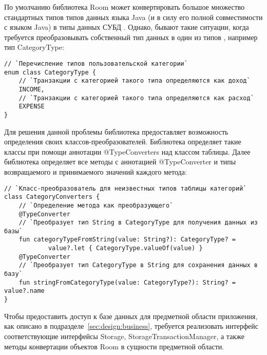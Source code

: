 По умолчанию библиотека Room может конвертировать большое множество стандартных типов типов данных языка Java (и \kt в силу его полной совместимости с языком Java) в типы данных СУБД \sqlite.
Однако, бывают такие ситуации, когда требуется преобразовывать собственный тип данных в один из типов \sqlite, например тип CategoryType:
\begin{lstlisting}[style=standard]
// `Перечисление типов пользовательской категории`
enum class CategoryType {
    // `Транзакции с категорией такого типа определяются как доход`
    INCOME,
    // `Транзакции с категорией такого типа определяются как расход`
    EXPENSE
}
\end{lstlisting}

Для решения данной проблемы библиотека предоставляет возможность определения своих классов-преобразователей.
Библиотека определяет такие классы при помощи аннотации @TypeConverters над классом таблицы.
Далее библиотека определяет все методы с аннотацией @TypeConverter и типы возвращаемого и принимаемого значений каждого метода:
\begin{lstlisting}[style=standard]
// `Класс-преобразователь для неизвестных типов таблицы категорий`
class CategoryConverters {
    // `Определение метода как преобразующего`
    @TypeConverter
    // `Преобразует тип String в CategoryType для получения данных из базы`
    fun categoryTypeFromString(value: String?): CategoryType? =
            value?.let { CategoryType.valueOf(value) }
    @TypeConverter
    // `Преобразует тип CategoryType в String для сохранения данных в базу`
    fun stringFromCategoryType(value: CategoryType?): String? = value?.name
}
\end{lstlisting}

Чтобы предоставить доступ к базе данных для предметной области приложения, как описано в подразделе~\ref{sec:design:business}, требуется реализовать интерфейс соответствующие интерфейсы Storage, StorageTransactionManager, а также методы конвертации объектов Room в сущности предметной области.